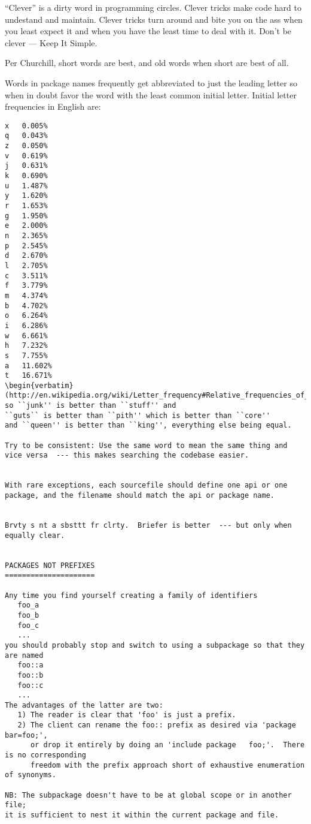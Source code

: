 ``Clever'' is a dirty word in programming circles.  Clever tricks 
make code hard to undestand and maintain.  Clever tricks turn around 
and bite you on the ass when you least expect it and when you have the 
least time to deal with it.  Don't be clever  --- Keep It Simple.


Per Churchill, short words are best, and old words when short are best of all.

Words in package names frequently get abbreviated to just the leading letter so 
when in doubt favor the word with the least common initial letter.  Initial letter frequencies in English 
are:
\begin{verbatim}
x	0.005%
q	0.043%
z	0.050%
v	0.619%
j	0.631%
k	0.690%
u	1.487%
y	1.620%
r	1.653%
g	1.950%
e	2.000%
n	2.365%
p	2.545%
d	2.670%
l	2.705%
c	3.511%
f	3.779%
m	4.374%
b	4.702%
o	6.264%
i	6.286%
w	6.661%
h	7.232%
s	7.755%
a	11.602%
t	16.671%
\begin{verbatim}
(http://en.wikipedia.org/wiki/Letter_frequency#Relative_frequencies_of_the_first_letters_of_a_word_in_the_English_language)
so ``junk'' is better than ``stuff'' and
``guts`` is better than ``pith'' which is better than ``core''
and ``queen'' is better than ``king'', everything else being equal.

Try to be consistent: Use the same word to mean the same thing and 
vice versa  --- this makes searching the codebase easier.


With rare exceptions, each sourcefile should define one api or one package, and the filename should match the api or package name.


Brvty s nt a sbsttt fr clrty.  Briefer is better  --- but only when equally clear.


PACKAGES NOT PREFIXES
=====================

Any time you find yourself creating a family of identifiers 
   foo_a
   foo_b
   foo_c
   ...
you should probably stop and switch to using a subpackage so that they are named 
   foo::a
   foo::b
   foo::c
   ...
The advantages of the latter are two:
   1) The reader is clear that 'foo' is just a prefix.
   2) The client can rename the foo:: prefix as desired via 'package bar=foo;',
      or drop it entirely by doing an 'include package   foo;'.  There is no corresponding 
      freedom with the prefix approach short of exhaustive enumeration of synonyms.

NB: The subpackage doesn't have to be at global scope or in another file;
it is sufficient to nest it within the current package and file.


\end{verbatim}
